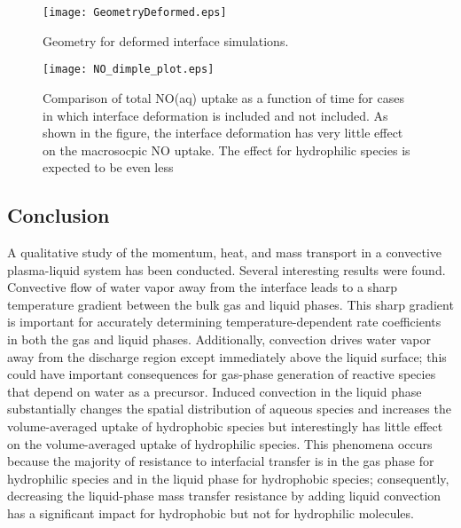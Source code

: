\begin{figure}[htb]
    \centering
    \texttt{[image: GeometryDeformed.eps]}
    \caption{Geometry for deformed interface simulations.}
    \label{fig:deformed_geom}
\end{figure}

\begin{figure}[htb]
    \centering
    \texttt{[image: NO\_dimple\_plot.eps]}
    \caption{Comparison of total NO(aq) uptake as a function of time for cases in which interface deformation is included and not included. As shown in the figure, the interface deformation has very little effect on the macrosocpic NO uptake. The effect for hydrophilic species is expected to be even less}
    \label{fig:NO_deform_compare}
\end{figure}

\subsection{Conclusion}

A qualitative study of the momentum, heat, and mass transport in a convective plasma-liquid system has been conducted. Several interesting results were found. Convective flow of water vapor away from the interface leads to a sharp temperature gradient between the bulk gas and liquid phases. This sharp gradient is important for accurately determining temperature-dependent rate coefficients in both the gas and liquid phases. Additionally, convection drives water vapor away from the discharge region except immediately above the liquid surface; this could have important consequences for gas-phase generation of reactive species that depend on water as a precursor. Induced convection in the liquid phase substantially changes the spatial distribution of aqueous species and increases the volume-averaged uptake of hydrophobic species but interestingly has little effect on the volume-averaged uptake of hydrophilic species. This phenomena occurs because the majority of resistance to interfacial transfer is in the gas phase for hydrophilic species and in the liquid phase for hydrophobic species; consequently, decreasing the liquid-phase mass transfer resistance by adding liquid convection has a significant impact for hydrophobic but not for hydrophilic molecules.

